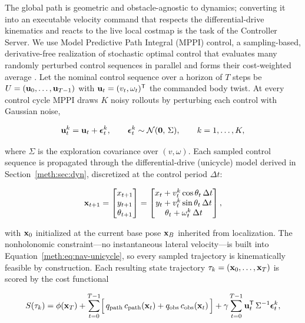 The global path is geometric and obstacle-agnostic to dynamics; converting it into an executable
velocity command that respects the differential-drive kinematics and reacts to the live local
costmap is the task of the Controller Server. We use Model Predictive Path Integral (MPPI)
control, a sampling-based, derivative-free realization of stochastic optimal control that
evaluates many randomly perturbed control sequences in parallel and forms their cost-weighted
average \cite{williams2017mppi}. Let the nominal control sequence over a horizon of $T$ steps be
$U=(\mathbf{u}_0,\dots,\mathbf{u}_{T-1})$ with $\mathbf{u}_t=(v_t,\omega_t)^{\mathsf{T}}$ the commanded body twist. At every
control cycle MPPI draws $K$ noisy rollouts by perturbing each control with Gaussian noise,

\begin{equation}\label{meth:eq:mppi-sample}
  \mathbf{u}_t^{k} = \mathbf{u}_t + \bm{\epsilon}_t^{k},
  \qquad \bm{\epsilon}_t^{k}\sim\mathcal{N}(\mathbf{0},\,\Sigma),
  \qquad k=1,\dots,K,
\end{equation}

where $\Sigma$ is the exploration covariance over $(v,\omega)$. Each sampled control sequence is
propagated through the differential-drive (unicycle) model derived in Section~\ref{meth:sec:dyn}, discretized
at the control period $\Delta t$:

\begin{equation}\label{meth:eq:nav-unicycle}
  \mathbf{x}_{t+1} =
  \begin{bmatrix} x_{t+1}\\ y_{t+1}\\ \theta_{t+1}\end{bmatrix} =
  \begin{bmatrix}
    x_t + v_t^{k}\cos\theta_t\,\Delta t\\
    y_t + v_t^{k}\sin\theta_t\,\Delta t\\
    \theta_t + \omega_t^{k}\,\Delta t
  \end{bmatrix},
\end{equation}

with $\mathbf{x}_0$ initialized at the current base pose $\mathbf{x}_B$ inherited from localization. The
nonholonomic constraint---no instantaneous lateral velocity---is built into
Equation~\eqref{meth:eq:nav-unicycle}, so every sampled trajectory is kinematically feasible by construction.
Each resulting state trajectory $\tau_k=(\mathbf{x}_0,\dots,\mathbf{x}_T)$ is scored by the cost functional

\begin{equation}\label{meth:eq:mppi-cost}
  S(\tau_k) = \phi(\mathbf{x}_T)
  + \sum_{t=0}^{T-1}\Bigl[\,
      q_{\mathrm{path}}\,c_{\mathrm{path}}(\mathbf{x}_t)
      + q_{\mathrm{obs}}\,c_{\mathrm{obs}}(\mathbf{x}_t)\,\Bigr]
  + \gamma\sum_{t=0}^{T-1}\mathbf{u}_t^{\mathsf{T}}\,\Sigma^{-1}\bm{\epsilon}_t^{k},
\end{equation}


